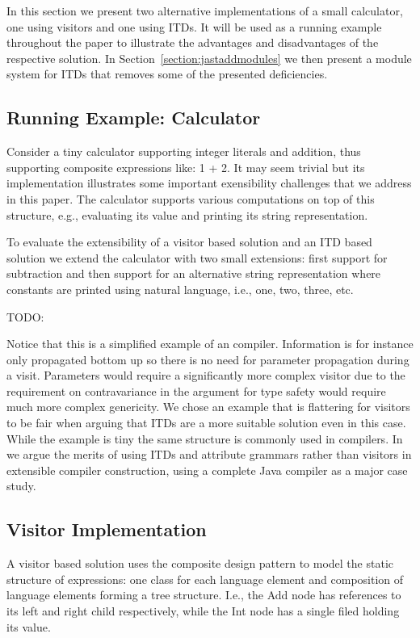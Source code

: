 In this section we present two alternative implementations of a small
calculator, one using visitors and one using ITDs. It will be used as a
running example throughout the paper to illustrate the advantages and
disadvantages of the respective solution. In Section~\ref{section:jastaddmodules}
we then present a module system for ITDs that removes some of the presented
deficiencies.

\subsection{Running Example: Calculator}
Consider a tiny calculator supporting integer literals and addition, thus 
supporting composite expressions like: 1 + 2. It may seem trivial but its 
implementation illustrates some important exensibility challenges that we 
address in this paper. The calculator supports various computations on top 
of this structure, e.g., evaluating its value and printing its string
representation.

To evaluate the extensibility of a visitor based solution and an ITD based
solution we extend the calculator with two small extensions: first support
for subtraction and then support for an alternative string representation 
where constants are printed using natural language, i.e., one, two, 
three, etc.

TODO: %

Notice that this is a simplified example of an compiler. Information is
for instance only propagated bottom up so there is no need for parameter
propagation during a visit. Parameters would require a significantly more 
complex visitor due to the requirement on contravariance in the argument 
for type safety would require much more complex genericity. We chose an 
example that is flattering for visitors to be fair when arguing that ITDs 
are a more suitable solution even in this case. While the example is 
tiny the same structure is commonly used in compilers. In~\cite{} we argue 
the merits of using ITDs and attribute grammars rather than visitors in 
extensible compiler construction, using a complete Java compiler as a 
major case study.

\subsection{Visitor Implementation}
A visitor based solution uses the composite design pattern to model the
static structure of expressions: one class for each language element and
composition of language elements forming a tree structure. I.e., the 
Add node has references to its left and right child respectively, while 
the Int node has a single filed holding its value.

